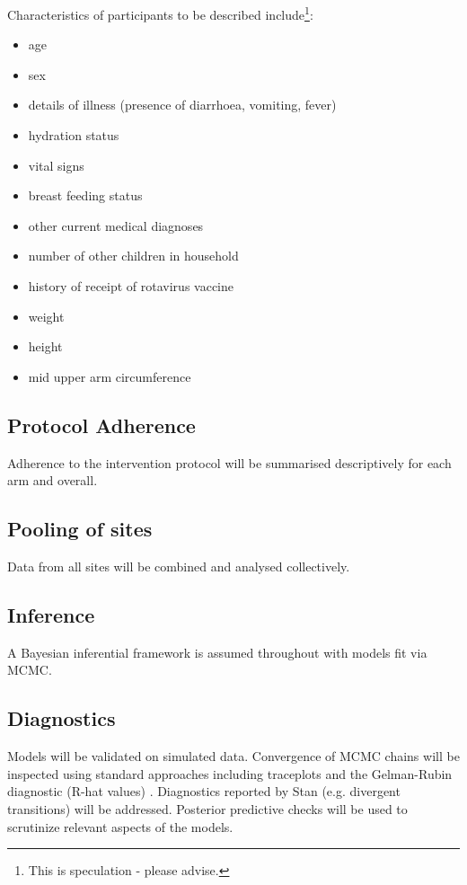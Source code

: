 \documentclass[a4paper]{article}
\begin{document}
Characteristics of participants to be described include\footnote{This is speculation - please advise.}:

\begin{itemize}
    \item age
    \item sex
    \item details of illness (presence of diarrhoea, vomiting, fever)
    \item hydration status
    \item vital signs
    \item breast feeding status
    \item other current medical diagnoses
    \item number of other children in household
    \item history of receipt of rotavirus vaccine
    \item weight
    \item height
    \item mid upper arm circumference
\end{itemize}

\subsection{Protocol Adherence}

Adherence to the intervention protocol will be summarised descriptively for each arm and overall.

\subsection{Pooling of sites}

Data from all sites will be combined and analysed collectively.

\subsection{Inference}

A Bayesian inferential framework is assumed throughout with models fit via MCMC.

\subsection{Diagnostics}

Models will be validated on simulated data.
Convergence of MCMC chains will be inspected using standard approaches including traceplots and the Gelman-Rubin diagnostic (R-hat values) \cite{gelman_rubin_1992}.
Diagnostics reported by Stan (e.g. divergent transitions) will be addressed. 
Posterior predictive checks will be used to scrutinize relevant aspects of the models.
\end{document}
